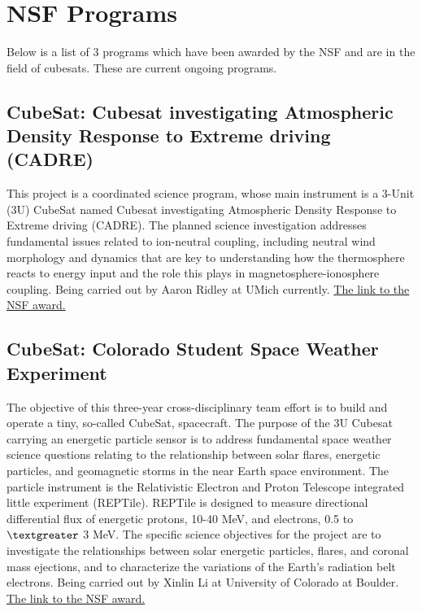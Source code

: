 \documentclass[11pt,a4paper]{report}
\begin{document}
\section{NSF Programs}
Below is a list of 3 programs which have been awarded by the NSF and are in the field of cubesats. These are current ongoing programs. 

\subsection{CubeSat: Cubesat investigating Atmospheric Density Response to Extreme driving (CADRE)}
This project is a coordinated science program, whose main instrument is a 3-Unit (3U) CubeSat named Cubesat investigating Atmospheric Density Response to Extreme driving (CADRE). The planned science investigation addresses fundamental issues related to ion-neutral coupling, including neutral wind morphology and dynamics that are key to understanding how the thermosphere reacts to energy input and the role this plays in magnetosphere-ionosphere coupling. Being carried out by Aaron Ridley at UMich currently. \href{http://nsf.gov/awardsearch/showAward?AWD_ID=1042815&HistoricalAwards=false}{The link to the NSF award.}

\subsection{CubeSat: Colorado Student Space Weather Experiment}

The objective of this three-year cross-disciplinary team effort is to build and operate a tiny, so-called CubeSat, spacecraft. The purpose of the 3U Cubesat carrying an energetic particle sensor is to address fundamental space weather science questions relating to the relationship between solar flares, energetic particles, and geomagnetic storms in the near Earth space environment. The particle instrument is the Relativistic Electron and Proton Telescope integrated little experiment (REPTile). REPTile is designed to measure directional differential flux of energetic protons, 10-40 MeV, and electrons, 0.5 to $\textgreater$ 3 MeV.  The specific science objectives for the project are to investigate the relationships between solar energetic particles, flares, and coronal mass ejections, and to characterize the variations of the Earth's radiation belt electrons. Being carried out by Xinlin Li at University of Colorado at Boulder. \href{http://nsf.gov/awardsearch/showAward?AWD_ID=1042815&HistoricalAwards=false}{The link to the NSF award.}
\end{document}
